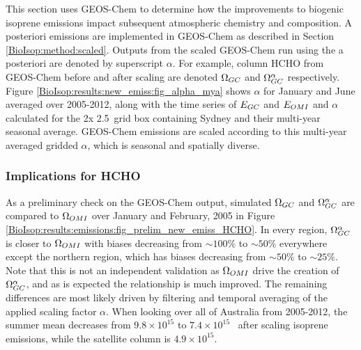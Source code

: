     This section uses GEOS-Chem to determine how the improvements to biogenic isoprene emissions impact subsequent atmospheric chemistry and composition.
    A posteriori emissions are implemented in GEOS-Chem as described in Section \ref{BioIsop:method:scaled}.
    Outputs from the scaled GEOS-Chem run using the a posteriori are denoted by superscript $\alpha$.
    For example, column HCHO from GEOS-Chem before and after scaling are denoted $\Omega_{GC}$ and $\Omega_{GC}^{\alpha}$ respectively.
    Figure \ref{BioIsop:results:new_emiss:fig_alpha_mya} shows $\alpha$ for January and June averaged over 2005-2012, along with the time series of $E_{GC}$ and $E_{OMI}$ and $\alpha$ calculated for the 2\degr x 2.5\degr ~grid box containing Sydney and their multi-year seasonal average.
    GEOS-Chem emissions are scaled according to this multi-year averaged gridded $\alpha$, which is seasonal and spatially diverse.
    
    
    
    \subsubsection{Implications for HCHO}
  
      As a preliminary check on the GEOS-Chem output, simulated $\Omega_{GC}$ and $\Omega_{GC}^{\alpha}$ are compared to $\Omega_{OMI}$ over January and February, 2005 in Figure \ref{BioIsop:results:emissions:fig_prelim_new_emiss_HCHO}.
      In every region, $\Omega_{GC}^{\alpha}$ is closer to $\Omega_{OMI}$ with biases decreasing from $\sim{100\%}$ to $\sim{50\%}$ everywhere except the northern region, which has biases decreasing from $\sim{50\%}$ to $\sim{25\%}$.
      Note that this is not an independent validation as $\Omega_{OMI}$ drive the creation of $\Omega_{GC}^{\alpha}$, and as is expected the relationship is much improved.
      The remaining differences are most likely driven by filtering and temporal averaging of the applied scaling factor $\alpha$.
      When looking over all of Australia from 2005-2012, the summer mean decreases from $ 9.8 \times 10^{15}$ to $ 7.4 \times 10^{15}$ \moleccm ~after scaling isoprene emissions, while the satellite column is $ 4.9 \times 10^{15}$.
      
